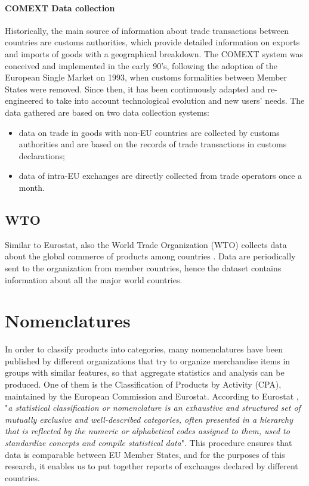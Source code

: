 


\paragraph{COMEXT Data collection}
Historically, the main source of information about trade transactions between countries are customs authorities, which provide detailed information on exports and imports of goods with a geographical breakdown.
The COMEXT system was conceived and implemented in the early 90's,  following the adoption of the European Single Market on 1993, when customs formalities between Member States were removed. Since then, it has been continuously adapted and re-engineered to take into account technological evolution and new users' needs. The data gathered are based on two data collection systems:
\begin{itemize}
    \item data on trade in goods with non-EU countries are collected by customs authorities and are based on the records of trade transactions in customs declarations;
    \item data of intra-EU exchanges are directly collected from trade operators once a month.
\end{itemize}


\subsection{WTO}
Similar to Eurostat, also the World Trade Organization (WTO) collects data about the global commerce of products among countries \cite{wto2022stats}. Data are periodically sent to the organization from member countries, hence the dataset contains information about all the major world countries.

\section{Nomenclatures}

In order to classify products into categories, many nomenclatures have been published by different organizations that try to organize merchandise items in groups with similar features, so that aggregate statistics and analysis can be produced. One of them is the Classification of Products by Activity (CPA), maintained by the European Commission and Eurostat.
According to Eurostat \cite{eurostat2022website}, "\textit{a statistical classification or nomenclature is an exhaustive and structured set of mutually exclusive and well-described categories, often presented in a hierarchy that is reflected by the numeric or alphabetical codes assigned to them, used to standardize concepts and compile statistical data}".
This procedure ensures that data is comparable between EU Member States, and for the purposes of this research, it enables us to put together reports of exchanges declared by different countries.


